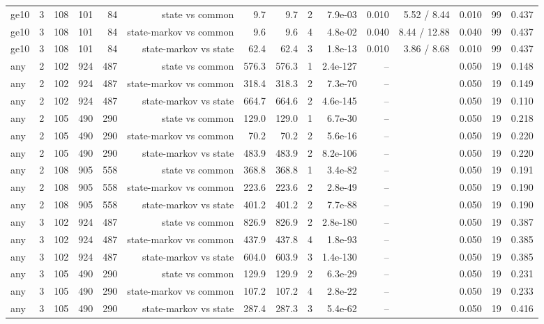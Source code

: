 \begin{table}[ht]
\begin{tabular}{llrrrrrrrrrrrrr}
ge10 & 3 & 108 & 101 & 84 & state vs common & 9.7 & 9.7 & 2 & 7.9e-03 & 0.010 & 5.52 / 8.44 & 0.010 & 99 & 0.437 \\
ge10 & 3 & 108 & 101 & 84 & state-markov vs common & 9.6 & 9.6 & 4 & 4.8e-02 & 0.040 & 8.44 / 12.88 & 0.040 & 99 & 0.437 \\
ge10 & 3 & 108 & 101 & 84 & state-markov vs state & 62.4 & 62.4 & 3 & 1.8e-13 & 0.010 & 3.86 / 8.68 & 0.010 & 99 & 0.437 \\
any & 2 & 102 & 924 & 487 & state vs common & 576.3 & 576.3 & 1 & 2.4e-127 & -- &  & 0.050 & 19 & 0.148 \\
any & 2 & 102 & 924 & 487 & state-markov vs common & 318.4 & 318.3 & 2 & 7.3e-70 & -- &  & 0.050 & 19 & 0.149 \\
any & 2 & 102 & 924 & 487 & state-markov vs state & 664.7 & 664.6 & 2 & 4.6e-145 & -- &  & 0.050 & 19 & 0.110 \\
any & 2 & 105 & 490 & 290 & state vs common & 129.0 & 129.0 & 1 & 6.7e-30 & -- &  & 0.050 & 19 & 0.218 \\
any & 2 & 105 & 490 & 290 & state-markov vs common & 70.2 & 70.2 & 2 & 5.6e-16 & -- &  & 0.050 & 19 & 0.220 \\
any & 2 & 105 & 490 & 290 & state-markov vs state & 483.9 & 483.9 & 2 & 8.2e-106 & -- &  & 0.050 & 19 & 0.220 \\
any & 2 & 108 & 905 & 558 & state vs common & 368.8 & 368.8 & 1 & 3.4e-82 & -- &  & 0.050 & 19 & 0.191 \\
any & 2 & 108 & 905 & 558 & state-markov vs common & 223.6 & 223.6 & 2 & 2.8e-49 & -- &  & 0.050 & 19 & 0.190 \\
any & 2 & 108 & 905 & 558 & state-markov vs state & 401.2 & 401.2 & 2 & 7.7e-88 & -- &  & 0.050 & 19 & 0.190 \\
any & 3 & 102 & 924 & 487 & state vs common & 826.9 & 826.9 & 2 & 2.8e-180 & -- &  & 0.050 & 19 & 0.387 \\
any & 3 & 102 & 924 & 487 & state-markov vs common & 437.9 & 437.8 & 4 & 1.8e-93 & -- &  & 0.050 & 19 & 0.385 \\
any & 3 & 102 & 924 & 487 & state-markov vs state & 604.0 & 603.9 & 3 & 1.4e-130 & -- &  & 0.050 & 19 & 0.385 \\
any & 3 & 105 & 490 & 290 & state vs common & 129.9 & 129.9 & 2 & 6.3e-29 & -- &  & 0.050 & 19 & 0.231 \\
any & 3 & 105 & 490 & 290 & state-markov vs common & 107.2 & 107.2 & 4 & 2.8e-22 & -- &  & 0.050 & 19 & 0.233 \\
any & 3 & 105 & 490 & 290 & state-markov vs state & 287.4 & 287.3 & 3 & 5.4e-62 & -- &  & 0.050 & 19 & 0.416 \\

\end{tabular}
\end{table}
